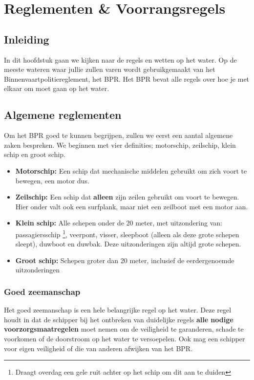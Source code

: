 \chapter{Reglementen \& Voorrangsregels}
\section{Inleiding}
In dit hoofdstuk gaan we kijken naar de regels en wetten op het water. Op de meeste wateren waar jullie zullen varen wordt gebruikgemaakt van het Binnenvaartpolitiereglement, het BPR. Het BPR bevat alle regels over hoe je met elkaar om moet gaan op het water.

\section{Algemene reglementen}
Om het BPR goed te kunnen begrijpen, zullen we eerst een aantal algemene zaken bespreken. We beginnen met vier definities; motorschip, zeilschip, klein schip en groot schip. 

\begin{itemize}
    \item \textbf{Motorschip:} Een schip dat mechanische middelen gebruikt om zich voort te bewegen, een motor dus.
    \item \textbf{Zeilschip:} Een schip dat \textbf{alleen} zijn zeilen gebruikt om voort te bewegen. Hier onder valt ook een surfplank, maar niet een zeilboot met een motor aan.
    \item \textbf{Klein schip:} Alle schepen onder de 20 meter, met uitzondering van: passagiersschip \footnote{Draagt overdag een gele ruit achter op het schip om dit aan te duiden}, veerpont, visser, sleepboot
(alleen als deze grote schepen sleept), duwboot en duwbak. Deze uitzonderingen zijn altijd grote schepen. 
    \item \textbf{Groot schip:} Schepen groter dan 20 meter, inclusief de eerdergenoemde uitzonderingen 
\end{itemize}

\subsection{Goed zeemanschap}
Het goed zeemanschap is een hele belangrijke regel op het water. Deze regel houdt in dat de schipper bij het ontbreken van duidelijke regels \textbf{alle nodige voorzorgsmaatregelen} moet nemen om de veiligheid te garanderen, schade te voorkomen of de doorstroom op het water te versoepelen. Ook mag een schipper voor eigen veiligheid of die van anderen afwijken van het BPR.

